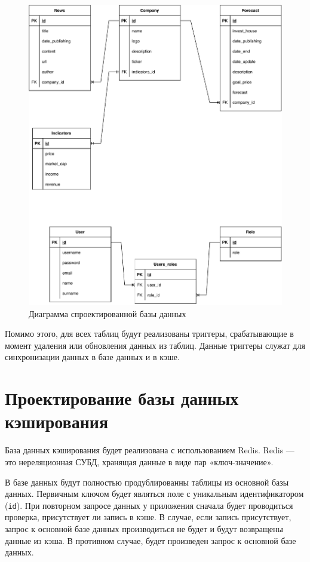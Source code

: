 \begin{figure}[h!]
	\begin{center}
		\includegraphics[scale=0.8]{inc/img/database.pdf}
	\end{center}
	\captionsetup{justification=centering}
	\caption{Диаграмма спроектированной базы данных}
	\label{img:database}
\end{figure}

\newpage

Помимо этого, для всех таблиц будут реализованы триггеры, срабатывающие в момент удаления или обновления данных из таблиц. Данные триггеры служат для синхронизации данных в базе данных и в кэше.
\section{Проектирование базы данных кэширования}

База данных кэширования будет реализована с использованием Redis. Redis --- это нереляционная СУБД, хранящая данные в виде пар «ключ-значение».

В базе данных будут полностью продублированны таблицы из основной базы данных. Первичным ключом будет являться поле с уникальным идентификатором (\texttt{id}).
При повторном запросе данных у приложения сначала будет проводиться проверка, присутствует ли запись в кэше. В случае, если запись присутствует, запрос к основной базе данных производиться не будет и будут возвращены данные из кэша. В противном случае, будет произведен запрос к основной базе данных.

